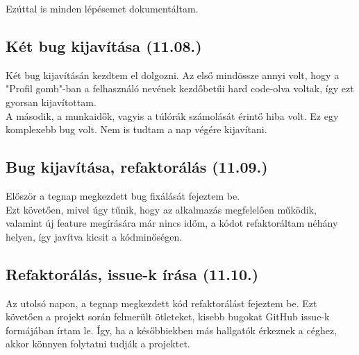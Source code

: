\documentclass[a4paper]{article}
\begin{document}
Ezúttal is minden lépésemet dokumentáltam.

\subsection{Két bug kijavítása (11.08.)}

Két bug kijavításán kezdtem el dolgozni. Az első mindössze annyi volt, hogy a "Profil gomb"-ban a
felhasználó nevének kezdőbetűi hard code-olva voltak, így ezt gyorsan kijavítottam.\\

A második, a munkaidők, vagyis a túlórák számolását érintő hiba volt. Ez egy komplexebb bug volt.
Nem is tudtam a nap végére kijavítani.

\subsection{Bug kijavítása, refaktorálás (11.09.)}

Először a tegnap megkezdett bug fixálását fejeztem be.\\

Ezt követően, mivel úgy tűnik, hogy az alkalmazás megfelelően működik, valamint új feature
megírására már nincs időm, a kódot refaktoráltam néhány helyen, így javítva kicsit a kódminőségen.

\subsection{Refaktorálás, issue-k írása (11.10.)}

Az utolsó napon, a tegnap megkezdett kód refaktorálást fejeztem be. Ezt követően a projekt során
felmerült ötleteket, kisebb bugokat GitHub issue-k formájában írtam le. Így, ha a későbbiekben más
hallgatók érkeznek a céghez, akkor könnyen folytatni tudják a projektet.


\end{document}
